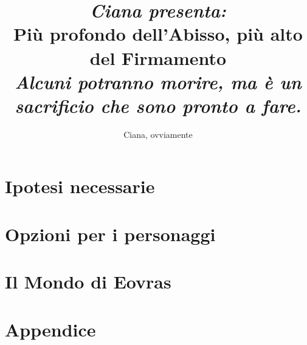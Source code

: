 \documentclass[letterpaper,twocolumn,openany,nodeprecatedcode]{dndbook}
\title{\large{\textit{Ciana presenta:}}\\
    Più profondo dell'Abisso, più alto del Firmamento \\
    \large {\textit{Alcuni potranno morire, ma è un sacrificio che sono pronto a fare.}}
    }
\author{Ciana, ovviamente}
\date{}
\begin{document}
\frontmatter

\maketitle

\tableofcontents

\mainmatter

\part{Ipotesi necessarie}

\part{Opzioni per i personaggi}



\part{Il Mondo di Eovras}





\part{Appendice}


\end{document}
